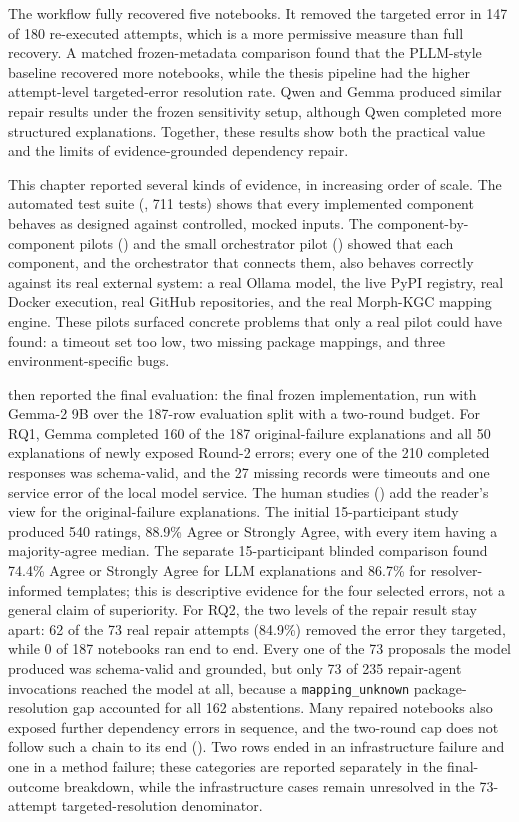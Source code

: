 The workflow fully recovered five notebooks. It removed the targeted error in
147 of 180 re-executed attempts, which is a more permissive measure than full
recovery. A matched frozen-metadata comparison found that the PLLM-style
baseline recovered more notebooks, while the thesis pipeline had the higher
attempt-level targeted-error resolution rate. Qwen and Gemma produced similar
repair results under the frozen sensitivity setup, although Qwen completed more
structured explanations. Together, these results show both the practical value
and the limits of evidence-grounded dependency repair.

\iffalse

This chapter reported several kinds of evidence, in increasing order of
scale. The automated test suite (, 711 tests) shows
that every implemented component behaves as designed against controlled,
mocked inputs. The component-by-component pilots
() and the small orchestrator pilot
() showed that each component, and the orchestrator that
connects them, also behaves correctly against its real external system: a
real Ollama model, the live PyPI registry, real Docker execution, real
GitHub repositories, and the real Morph-KGC mapping engine. These pilots
surfaced concrete problems that only a real pilot could have found: a
timeout set too low, two missing package mappings, and three
environment-specific bugs.

 then reported the final evaluation: the final
frozen implementation, run with Gemma-2 9B over the 187-row evaluation
split with a two-round budget. For RQ1, Gemma completed 160 of the 187
original-failure explanations and all 50 explanations of newly exposed
Round-2 errors; every one of the 210 completed responses was schema-valid,
and the 27 missing records were timeouts and one service error of the local
model service. The human studies () add the reader's
view for the original-failure explanations. The initial 15-participant study
produced 540 ratings, 88.9\% Agree or Strongly Agree, with every item having a
  majority-agree median. The separate 15-participant blinded comparison found
  74.4\% Agree or Strongly Agree for LLM explanations and 86.7\% for
  resolver-informed templates; this is descriptive evidence for the four
  selected errors, not a general claim of superiority.
For RQ2, the two levels of the repair result stay apart: 62 of the 73 real
repair attempts (84.9\%) removed the error they targeted, while 0 of 187
notebooks ran end to end. Every one of the 73 proposals the model produced
was schema-valid and grounded, but only 73 of 235 repair-agent invocations
reached the model at all, because a \texttt{mapping\_unknown}
package-resolution gap accounted for all 162 abstentions. Many repaired
notebooks also exposed further dependency errors in sequence, and the
two-round cap does not follow such a chain to its end
(). Two rows ended in
an infrastructure failure and one in a method failure; these categories
are reported separately in the final-outcome breakdown, while the
infrastructure cases remain unresolved in the 73-attempt
targeted-resolution denominator.

